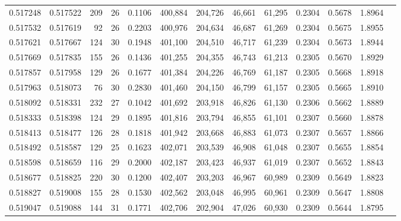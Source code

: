 \begin{tabular}{rrrrrrrrrrrrr}
0.517248 & 0.517522 &    209 &    26 &                                     0.1106 & 400,884 & 204,726 &  46,661 &  61,295 & 0.2304 & 0.5678 & 1.8964 \\
0.517532 & 0.517619 &     92 &    26 &                                     0.2203 & 400,976 & 204,634 &  46,687 &  61,269 & 0.2304 & 0.5675 & 1.8955 \\
0.517621 & 0.517667 &    124 &    30 &                                     0.1948 & 401,100 & 204,510 &  46,717 &  61,239 & 0.2304 & 0.5673 & 1.8944 \\
0.517669 & 0.517835 &    155 &    26 &                                     0.1436 & 401,255 & 204,355 &  46,743 &  61,213 & 0.2305 & 0.5670 & 1.8929 \\
0.517857 & 0.517958 &    129 &    26 &                                     0.1677 & 401,384 & 204,226 &  46,769 &  61,187 & 0.2305 & 0.5668 & 1.8918 \\
0.517963 & 0.518073 &     76 &    30 &                                     0.2830 & 401,460 & 204,150 &  46,799 &  61,157 & 0.2305 & 0.5665 & 1.8910 \\
0.518092 & 0.518331 &    232 &    27 &                                     0.1042 & 401,692 & 203,918 &  46,826 &  61,130 & 0.2306 & 0.5662 & 1.8889 \\
0.518333 & 0.518398 &    124 &    29 &                                     0.1895 & 401,816 & 203,794 &  46,855 &  61,101 & 0.2307 & 0.5660 & 1.8878 \\
0.518413 & 0.518477 &    126 &    28 &                                     0.1818 & 401,942 & 203,668 &  46,883 &  61,073 & 0.2307 & 0.5657 & 1.8866 \\
0.518492 & 0.518587 &    129 &    25 &                                     0.1623 & 402,071 & 203,539 &  46,908 &  61,048 & 0.2307 & 0.5655 & 1.8854 \\
0.518598 & 0.518659 &    116 &    29 &                                     0.2000 & 402,187 & 203,423 &  46,937 &  61,019 & 0.2307 & 0.5652 & 1.8843 \\
0.518677 & 0.518825 &    220 &    30 &                                     0.1200 & 402,407 & 203,203 &  46,967 &  60,989 & 0.2309 & 0.5649 & 1.8823 \\
0.518827 & 0.519008 &    155 &    28 &                                     0.1530 & 402,562 & 203,048 &  46,995 &  60,961 & 0.2309 & 0.5647 & 1.8808 \\
0.519047 & 0.519088 &    144 &    31 &                                     0.1771 & 402,706 & 202,904 &  47,026 &  60,930 & 0.2309 & 0.5644 & 1.8795 \\

\end{tabular}
